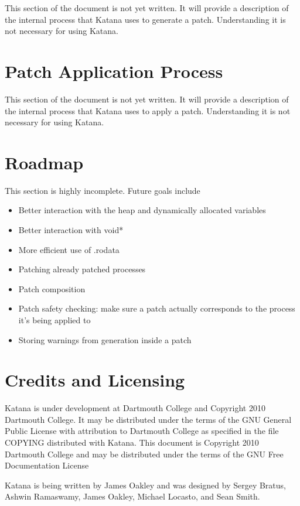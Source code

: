 \documentclass[11pt]{article}
\begin{document}
  This section of the document is not yet written. It will provide a
  description of the internal process that Katana uses to generate a
  patch. Understanding it is not necessary for using Katana.
\section{Patch Application Process}
\label{sec-9}

  This section of the document is not yet written. It will provide a
  description of the internal process that Katana uses to apply a
  patch. Understanding it is not necessary for using Katana.
\section{Roadmap}
\label{sec-10}

  This section is highly incomplete. Future goals include
\begin{itemize}
\item Better interaction with the heap and dynamically allocated variables
\item Better interaction with void*
\item More efficient use of .rodata
\item Patching already patched processes
\item Patch composition
\item Patch safety checking: make sure a patch actually corresponds to
    the process it's being applied to
\item Storing warnings from generation inside a patch
\end{itemize}
\section{Credits and Licensing}
\label{sec-11}

  Katana is under development at Dartmouth College and Copyright 2010
  Dartmouth College. It may be distributed under the terms of the GNU
  General Public License with attribution to Dartmouth College as
  specified in the file COPYING distributed with Katana. This document
  is Copyright 2010 Dartmouth College and may be distributed under the
  terms of the GNU Free Documentation License

  Katana is being written by James Oakley and was designed
  by Sergey Bratus, Ashwin Ramaswamy, James Oakley, Michael Locasto,
  and Sean Smith.
\end{document}

